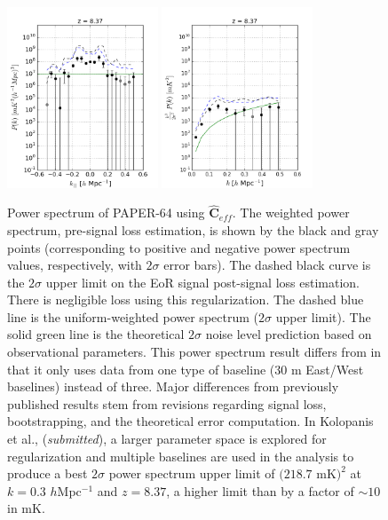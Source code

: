 \documentclass[preprint2,numberedappendix,tighten]{aastex6}  %
\begin{document}
\begin{figure}
	\centering
	\includegraphics[width=0.4\textwidth]{plots/ps1_data_add.png}
	\includegraphics[width=0.4\textwidth]{plots/ps2_data_add.png}
	\caption{Power spectrum of PAPER-64 using $\widehat{\textbf{C}}_{eff}$. The weighted power spectrum, pre-signal loss estimation, is shown by the black and gray points (corresponding to positive and 
negative power spectrum values, respectively, with $2\sigma$ error bars). The dashed black curve is the $2\sigma$ upper limit on the EoR signal post-signal loss estimation. There is negligible loss using this regularization. The dashed blue line is the uniform-weighted 
power spectrum ($2\sigma$ upper limit). The solid green line is the theoretical $2\sigma$ noise level prediction based on 
observational parameters. This power spectrum result differs from  in that it only uses data from one type of baseline ($30$ m 
East/West baselines) instead of three. Major differences from previously published results stem from revisions regarding signal 
loss, bootstrapping, and the theoretical error computation. In Kolopanis et al., (\textit{submitted}), a larger parameter space is explored for regularization and multiple baselines are used in the analysis to produce a best $2\sigma$ power spectrum upper limit of $(218.7$ mK$)^{2}$ at $k=0.3$ $h$Mpc$^{-1}$ and $z=8.37$, 
a higher limit than  by a factor of $\sim$$10$ in mK.}
	\label{fig:ps1_data}
\end{figure}
\end{document}
